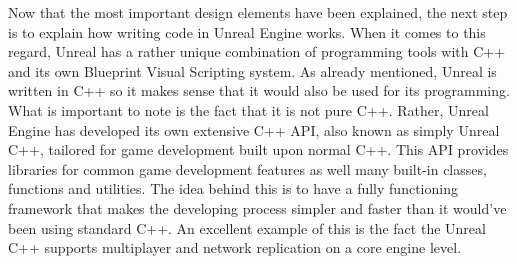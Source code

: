 Now that the most important design elements have been explained, the next step is to explain how writing code in Unreal Engine works. When it comes to this regard, Unreal has a rather unique combination of programming tools with C++ and its own Blueprint Visual Scripting system. As already mentioned, Unreal is written in C++ so it makes sense that it would also be used for its programming. What is important to note is the fact that it is not pure C++. Rather, Unreal Engine has developed its own extensive C++ \acs{API}, also known as simply Unreal C++, tailored for game development built upon normal C++\cite{bib:UECPlus}. This \acs{API} provides libraries for common game development features as well many built-in classes, functions and utilities. The idea behind this is to have a fully functioning framework that makes the developing process simpler and faster than it would've been using standard C++. An excellent example of this is the fact the Unreal C++ supports multiplayer and network replication on a core engine level.\\

